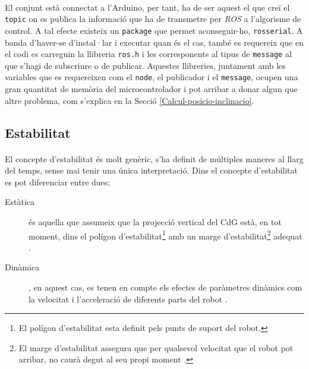 \documentclass[12pt,a4paper,final,twoside]{article}
\begin{document}
\paragraph{}El conjunt està connectat a l'Arduino, per tant, ha de ser aquest el que creï el \texttt{topic} on es publica la informació que ha de transmetre per \textit{ROS} a l'algorisme de control. A tal efecte existeix un \texttt{package} que permet aconseguir-ho, \texttt{rosserial}. A banda d'haver-se d'instal·lar i executar quan és el cas, també es requereix que en el codi es carreguin la llibreria \texttt{ros.h} i les corresponents al tipus de \texttt{message} al que s'hagi de subscriure o de publicar. Aquestes llibreries, juntament amb les variables que es requereixen com el \texttt{node}, el publicador i el \texttt{message}, ocupen una gran quantitat de memòria del microcontrolador i pot arribar a donar algun que altre problema, com s'explica en la Secció \ref{Calcul-posicio-inclinacio}. 



\subsection{Estabilitat}
\label{Estabilitat}

\paragraph{}El concepte d'estabilitat és molt genèric, s'ha definit de múltiples maneres al llarg del temps, sense mai tenir una única interpretació. Dins el concepte d'estabilitat es pot diferenciar entre dues:
\begin{description}

\item[Estàtica] és aquella que assumeix que la projecció vertical del CdG està, en tot moment, dins el polígon d'estabilitat\footnote{El polígon d'estabilitat esta definit pels punts de suport del robot.} amb un marge d'estabilitat\footnote{El marge d'estabilitat assegura que per qualsevol velocitat que el robot pot arribar, no caurà degut al seu propi moment \cite{Hugel1999}.} adequat \cite{Hugel1999}.

\item[Dinàmica], en aquest cas, es tenen en compte els efectes de paràmetres dinàmics com la velocitat i l'acceleració de diferents parts del robot \cite{Yazdani2012}.

\end{description}
\end{document}
